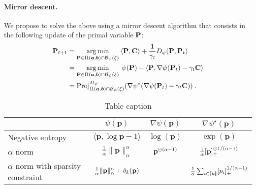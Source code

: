 \paragraph{Mirror descent.}
We propose to solve the above using a mirror descent algorithm that consists in the following update of the primal variable ${\mathbf{P}}$:
\begin{align}
  {\mathbf{P}}_{t+1} &= \operatorname*{arg\,min}_{{\mathbf{P}} \in \Pi(\bm{a}, \bm{b}) \cap \mathcal{B}_\psi(\xi)} \: \langle {\mathbf{P}} , {\mathbf{C}} \rangle + \frac{1}{\gamma_t} D_{\psi}({\mathbf{P}}, {\mathbf{P}}_t) \\
  &= \operatorname*{arg\,min}_{{\mathbf{P}} \in \Pi(\bm{a}, \bm{b}) \cap \mathcal{B}_\psi(\xi)} \: \psi({\mathbf{P}}) - \langle {\mathbf{P}} , \nabla \psi({\mathbf{P}}_t) - \gamma_t {\mathbf{C}} \rangle \\
  &= \operatorname{Proj}^{D_\psi}_{\Pi(\bm{a}, \bm{b}) \cap \mathcal{B}_\psi(\xi)}(\nabla \psi^*(\nabla \psi({\mathbf{P}}_t) - \gamma_t {\mathbf{C}})) \:.
\end{align}

\begin{table}[h]
  \centering
  \caption{Table caption}
  \label{tab:example}
  \begin{tabular}{lccc}
    \toprule
    & $\psi(\mathbf{p})$ & $\nabla \psi(\mathbf{p})$ & $\nabla \psi^\star(\mathbf{p})$ \\
    \midrule
    Negative entropy & $\langle \mathbf{p}, \log \mathbf{p} - 1 \rangle$ & $\log(\mathbf{p})$ & $\exp(\mathbf{p})$ \\
    $\alpha$ norm & $\frac{1}{\alpha} \| \mathbf{p} \|_{\alpha}^{\alpha}$ & ${\mathbf{p}}^{\odot (\alpha-1)}$ & $\frac{1}{\alpha} [{\mathbf{p}}]_{+}^{\odot 1 / (\alpha-1)}$ \\
    $\alpha$ norm with sparsity constraint & $\frac{1}{\alpha} \| \mathbf{p} \|_{\alpha}^{\alpha} + \delta_{k}({\mathbf{p}})$ & & $\frac{1}{\alpha} \sum_{i \in {[\![k]\!]}} [p_i]_{+}^{1 / (\alpha-1)}$ \\
    \bottomrule
  \end{tabular}
  \vspace{0.5cm}
\end{table}


